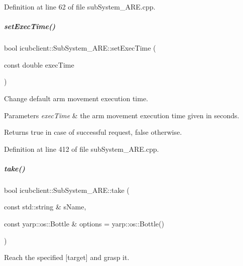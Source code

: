 Definition at line 62 of file sub\+System\+\_\+\+A\+R\+E.\+cpp.

\mbox{\label{group__icubclient__subsystems_a57b41efd7a13037bd383e4cdbd0b11ab}} 
\subparagraph{\texorpdfstring{set\+Exec\+Time()}{setExecTime()}}
{\footnotesize\ttfamily bool icubclient\+::\+Sub\+System\+\_\+\+A\+R\+E\+::set\+Exec\+Time (\begin{DoxyParamCaption}\item[{const double}]{exec\+Time }\end{DoxyParamCaption})}



Change default arm movement execution time. 


\begin{DoxyParams}{Parameters}
{\em exec\+Time} & the arm movement execution time given in seconds. \\
\hline
\end{DoxyParams}
\begin{DoxyReturn}{Returns}
true in case of successful request, false otherwise. 
\end{DoxyReturn}


Definition at line 412 of file sub\+System\+\_\+\+A\+R\+E.\+cpp.

\mbox{\label{group__icubclient__subsystems_a7806d075279d1593b7c63fda368aa3f8}} 
\subparagraph{\texorpdfstring{take()}{take()}}
{\footnotesize\ttfamily bool icubclient\+::\+Sub\+System\+\_\+\+A\+R\+E\+::take (\begin{DoxyParamCaption}\item[{const std\+::string \&}]{s\+Name,  }\item[{const yarp\+::os\+::\+Bottle \&}]{options = {\ttfamily yarp\+:\+:os\+:\+:Bottle()} }\end{DoxyParamCaption})}



Reach the specified \mbox{[}target\mbox{]} and grasp it. 

